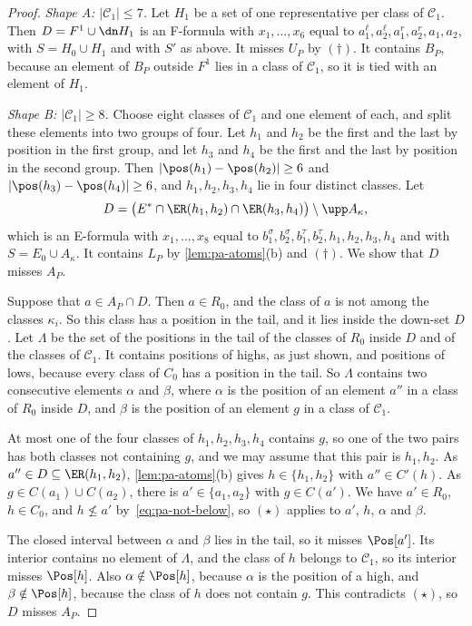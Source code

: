 \begin{proof}
\emph{Shape A: $|\mathcal{C}_1| \leq 7$.}
Let $H_1$ be a set of one representative per class of $\mathcal{C}_1$.
Then $D = F^1 \cup \dn H_1$ is an F-formula with $x_1, \dots, x_6$ equal to $a^\ell_1, a^\ell_2, a^r_1, a^r_2, a_1, a_2$, with $S = H_0 \cup H_1$ and with $S'$ as above.
It misses $U_P$ by $(\dagger)$.
It contains $B_P$, because an element of $B_P$ outside $F^1$ lies in a class of $\mathcal{C}_1$, so it is tied with an element of $H_1$.

\emph{Shape B: $|\mathcal{C}_1| \geq 8$.}
Choose eight classes of $\mathcal{C}_1$ and one element of each, and split these elements into two groups of four.
Let $h_1$ and $h_2$ be the first and the last by position in the first group, and let $h_3$ and $h_4$ be the first and the last by position in the second group.
Then $|\pos(h_1) - \pos(h_2)| \geq 6$ and $|\pos(h_3) - \pos(h_4)| \geq 6$, and $h_1, h_2, h_3, h_4$ lie in four distinct classes.
Let
\[
D = \bigl(E^* \cap \ER(h_1, h_2) \cap \ER(h_3, h_4)\bigr) \setminus \upp A_\kappa,
\]
which is an E-formula with $x_1, \dots, x_8$ equal to $b^\sigma_1, b^\sigma_2, b^\tau_1, b^\tau_2, h_1, h_2, h_3, h_4$ and with $S = E_0 \cup A_\kappa$.
It contains $L_P$ by \cref{lem:pa-atoms}(b) and $(\dagger)$.
We show that $D$ misses $A_P$.

Suppose that $a \in A_P \cap D$.
Then $a \in R_0$, and the class of $a$ is not among the classes $\kappa_i$.
So this class has a position in the tail, and it lies inside the down-set $D$.
Let $\Lambda$ be the set of the positions in the tail of the classes of $R_0$ inside $D$ and of the classes of $\mathcal{C}_1$.
It contains positions of highs, as just shown, and positions of lows, because every class of $C_0$ has a position in the tail.
So $\Lambda$ contains two consecutive elements $\alpha$ and $\beta$, where $\alpha$ is the position of an element $a''$ in a class of $R_0$ inside $D$, and $\beta$ is the position of an element $g$ in a class of $\mathcal{C}_1$.

At most one of the four classes of $h_1, h_2, h_3, h_4$ contains $g$, so one of the two pairs has both classes not containing $g$, and we may assume that this pair is $h_1, h_2$.
As $a'' \in D \subseteq \ER(h_1, h_2)$, \cref{lem:pa-atoms}(b) gives $h \in \{h_1, h_2\}$ with $a'' \in C'(h)$.
As $g \in C(a_1) \cup C(a_2)$, there is $a' \in \{a_1, a_2\}$ with $g \in C(a')$.
We have $a' \in R_0$, $h \in C_0$, and $h \not\leq a'$ by~\eqref{eq:pa-not-below}, so $(\star)$ applies to $a'$, $h$, $\alpha$ and $\beta$.

The closed interval between $\alpha$ and $\beta$ lies in the tail, so it misses $\Pos[a']$.
Its interior contains no element of $\Lambda$, and the class of $h$ belongs to $\mathcal{C}_1$, so its interior misses $\Pos[h]$.
Also $\alpha \notin \Pos[h]$, because $\alpha$ is the position of a high, and $\beta \notin \Pos[h]$, because the class of $h$ does not contain $g$.
This contradicts $(\star)$, so $D$ misses $A_P$.
\end{proof}


